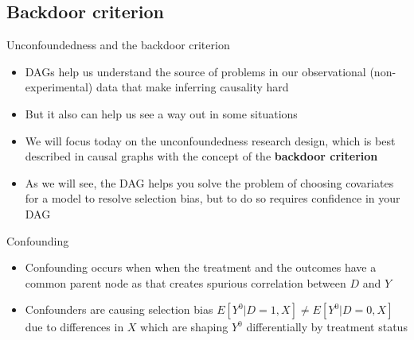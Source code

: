 \documentclass{beamer}
\begin{document}


\subsection{Backdoor criterion}

\begin{frame}{Unconfoundedness and the backdoor criterion}

  \begin{itemize}

    \item DAGs help us understand the source of problems in our observational (non-experimental) data that make inferring causality hard
    \item But it also can help us see a way out in some situations
    \item We will focus today on the unconfoundedness research design, which is best described in causal graphs with the concept of the \textbf{backdoor criterion}
    \item As we will see, the DAG helps you solve the problem of choosing covariates for a model to resolve selection bias, but to do so requires confidence in your DAG
  \end{itemize}

\end{frame}

\begin{frame}{Confounding}

  \begin{itemize}
    \item Confounding occurs when when the treatment and the outcomes have a common parent node as that creates spurious correlation between $D$ and $Y$

          \begin{center}
          \end{center}

          \item Confounders are causing selection bias $E[Y^0|D=1, X] \neq E[Y^0|D=0, X]$ due to differences in $X$ which are shaping $Y^0$ differentially by treatment status
  \end{itemize}
\end{frame}
\end{document}
